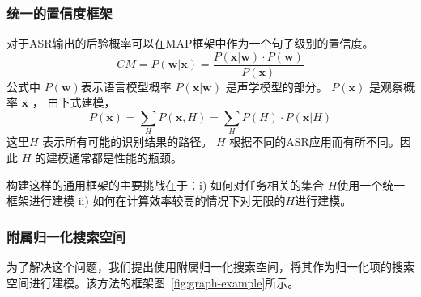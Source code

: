   \subsubsection{统一的置信度框架}
  对于ASR输出的后验概率可以在MAP框架中作为一个句子级别的置信度。
  \begin{equation}\label{eq:cm-post}
        CM=P(\mathbf{w}|\mathbf{x}) =
         \frac{P(\mathbf{x}|\mathbf{w})\cdot P(\mathbf{w})}{P(\mathbf{x})}
  \end{equation}
 公式中 $P(\mathbf{w})$表示语言模型概率 $P(\mathbf{x}|\mathbf{w})$  是声学模型的部分。 $P(\mathbf{x})$ 是观察概率 $\mathbf{x}$ ， 由下式建模，
   \begin{equation}\label{eq:cm-obser}
        P(\mathbf{x})=\sum_H P(\mathbf{x},H)= \sum_H P(H) \cdot  P(\mathbf{x}|H)
  \end{equation}
 这里$H$ 表示所有可能的识别结果的路径。 $H$ 根据不同的ASR应用而有所不同。因此 $H$ 的建模通常都是性能的瓶颈。

构建这样的通用框架的主要挑战在于：i) 如何对任务相关的集合 $H$使用一个统一框架进行建模 ii) 如何在计算效率较高的情况下对无限的$H$进行建模。


 \subsubsection{附属归一化搜索空间}
 \label{Sec:norm-graph-detail}

 为了解决这个问题，我们提出使用附属归一化搜索空间，将其作为归一化项的搜索空间进行建模。该方法的框架图~\ref{fig:graph-example}所示。 

